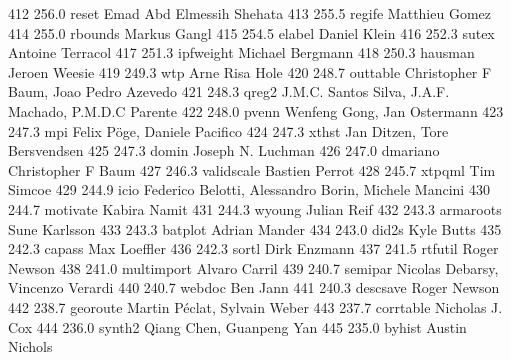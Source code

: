    412    256.0    reset         Emad Abd Elmessih Shehata               
   413    255.5    regife        Matthieu Gomez                          
   414    255.0    rbounds       Markus Gangl                            
   415    254.5    elabel        Daniel Klein                            
   416    252.3    sutex         Antoine Terracol                        
   417    251.3    ipfweight     Michael Bergmann                        
   418    250.3    hausman       Jeroen Weesie                           
   419    249.3    wtp           Arne Risa Hole                          
   420    248.7    outtable      Christopher F Baum, Joao Pedro Azevedo  
   421    248.3    qreg2         J.M.C. Santos Silva, J.A.F. Machado,    
                                   P.M.D.C Parente                         
   422    248.0    pvenn         Wenfeng Gong, Jan Ostermann             
   423    247.3    mpi           Felix Pöge, Daniele Pacifico           
   424    247.3    xthst         Jan Ditzen, Tore Bersvendsen            
   425    247.3    domin         Joseph N. Luchman                       
   426    247.0    dmariano      Christopher F Baum                      
   427    246.3    validscale    Bastien Perrot                          
   428    245.7    xtpqml        Tim Simcoe                              
   429    244.9    icio          Federico Belotti, Alessandro Borin,     
                                   Michele Mancini                         
   430    244.7    motivate      Kabira Namit                            
   431    244.3    wyoung        Julian Reif                             
   432    243.3    armaroots     Sune Karlsson                           
   433    243.3    batplot       Adrian Mander                           
   434    243.0    did2s         Kyle Butts                              
   435    242.3    capass        Max Loeffler                            
   436    242.3    sortl         Dirk Enzmann                            
   437    241.5    rtfutil       Roger Newson                            
   438    241.0    multimport    Alvaro Carril                           
   439    240.7    semipar       Nicolas Debarsy, Vincenzo Verardi       
   440    240.7    webdoc        Ben Jann                                
   441    240.3    descsave      Roger Newson                            
   442    238.7    georoute      Martin Péclat, Sylvain Weber           
   443    237.7    corrtable     Nicholas J. Cox                         
   444    236.0    synth2        Qiang Chen, Guanpeng Yan                
   445    235.0    byhist        Austin Nichols                          

